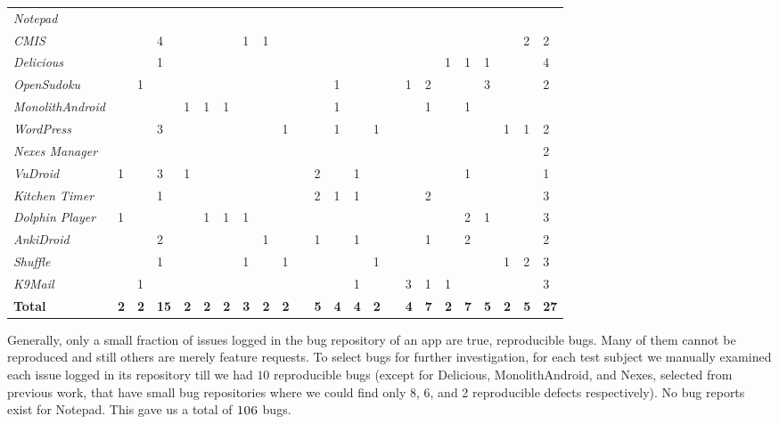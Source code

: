 \begin{sidewaystable*}
\begin{tabular}{llllllllllllllllllllllll}
\midrule
\textit{Notepad}&&&&&&&&&&&&&&&&&&&&&&&\\
\textit{CMIS}&&&4&&&&1&1&&&&&&&&&&&&&&2&2\\
\textit{Delicious}&&&1&&&&&&&&&&&&&&&1&1&1&&&4\\
\textit{OpenSudoku}&&1&&&&&&&&&&1&&&&1&2&&&3&&&2\\
\textit{MonolithAndroid}&&&&1&1&1&&&&&&1&&&&&1&&1&&&&\\
\textit{WordPress}&&&3&&&&&&1&&&1&&1&&&&&&&1&1&2\\
\textit{Nexes Manager}&&&&&&&&&&&&&&&&&&&&&&&2\\
\midrule
\textit{VuDroid}&1&&3&1&&&&&&&2&&1&&&&&&1&&&&1\\
\textit{Kitchen Timer}&&&1&&&&&&&&2&1&1&&&&2&&&&&&3\\
\textit{Dolphin Player}&1&&&&1&1&1&&&&&&&&&&&&2&1&&&3\\
\textit{AnkiDroid}&&&2&&&&&1&&&1&&1&&&&1&&2&&&&2\\
\textit{Shuffle}&&&1&&&&1&&1&&&&&1&&&&&&&1&2&3\\
\textit{K9Mail}&&1&&&&&&&&&&&1&&&3&1&1&&&&&3\\
\midrule
\textbf{Total}& \textbf{2} & \textbf{2} & \textbf{15} & \textbf{2} & \textbf{2} & \textbf{2} & \textbf{3} & \textbf{2} & \textbf{2} && \textbf{5} & \textbf{4} & \textbf{4} & \textbf{2} && \textbf{4} & \textbf{7} & \textbf{2} & \textbf{7} & \textbf{5} & \textbf{2} & \textbf{5} & \textbf{27} \\
\bottomrule
\end{tabular}
\end{sidewaystable*}

Generally, only a small fraction of issues logged in the bug repository of an app are true, reproducible bugs. Many of them cannot be reproduced and
still others are merely feature requests. To select bugs for further investigation, for each test subject we manually examined each issue logged in
its repository till we had $10$ reproducible bugs (except for Delicious, MonolithAndroid, and Nexes, selected from previous work, that have small bug repositories where we could find only 8, 6, and 2 reproducible defects respectively). No bug reports exist for Notepad. This gave us a total of $\textsc{106}$ bugs.



